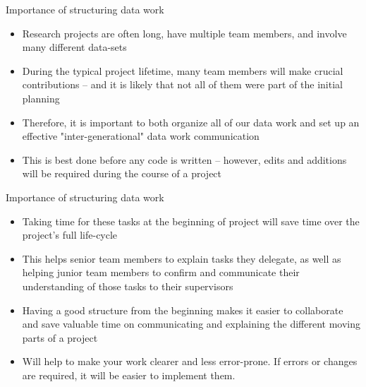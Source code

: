 \documentclass[aspectratio=169]{beamer}
\begin{document}
\begin{frame}{Importance of structuring data work}
	
		\begin{itemize}
            \item Research projects are often long, have multiple team members, and involve many different data-sets

            \vspace{.2cm}
            \item During the typical project lifetime, many team members will make crucial contributions -- and it is likely that not all of them were part of the initial planning

            \vspace{.2cm}
		  	\item Therefore, it is important to both organize all of our data work and set up an effective "inter-generational" data work communication
		  	
		  	\vspace{.2cm}
		  	\item This is best done before any code is written -- however, edits and additions will be required during the course of a project
        \end{itemize}
	
\end{frame}

\begin{frame}{Importance of structuring data work}
	
		\begin{itemize}
            \item Taking time for these tasks at the beginning of project will save time over the project's full life-cycle
            \vspace{.2cm}
            \item This helps senior team members to explain tasks they delegate, as well as helping junior team members to confirm and communicate their understanding of those tasks to their supervisors
            \vspace{.2cm}
            \item Having a good structure from the beginning makes it easier to collaborate and save valuable time on communicating and explaining the different moving parts of a project
              \vspace{.2cm}
            \item Will help to make your work clearer and less error-prone. If errors or changes are required, it will be easier to implement them. 
        \end{itemize}
	
\end{frame}
\end{document}

